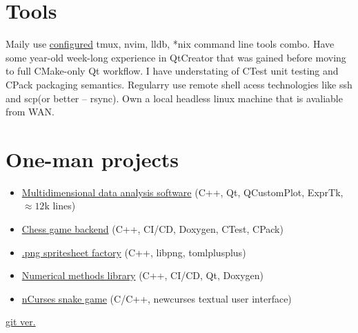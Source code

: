 \section{Tools}
Maily use \href{https://github.com//Dolfost/dotfiles}{configured} tmux, nvim,
lldb, *nix command line tools combo. Have some year-old week-long experience in
QtCreator that was gained before moving to full CMake-only Qt workflow. I have
understating of CTest unit testing and CPack packaging semantics. Regularry use
remote shell acess technologies like ssh and scp(or better -- rsync). Own a
local headless linux machine that is avaliable from WAN.

\section{One-man projects}
\begin{itemize}
	\item \href{https://github.com/Dolfost/matstat}{Multidimensional data analysis software} (C++, Qt, QCustomPlot, ExprTk, \(\approx 12\)k lines)
	\item \href{https://github.com/Dolfost/tartan}{Chess game backend} (C++, CI/CD, Doxygen, CTest, CPack)
	\item \href{https://github.com/Dolfost/ssmk/tree/develop}{.png spritesheet factory} (C++, libpng, tomlplusplus)
	\item \href{https://github.com/Dolfost/calgo}{Numerical methods library} (C++, CI/CD, Qt, Doxygen) 
	\item \href{https://github.com/Dolfost/snake-cpp}{nCurses snake game} (C/C++, newcurses textual user interface)
\end{itemize}

\vfill{}

\begin{center}
	\tiny \href{\lrthomepage}{git ver. \lrtversion}
\end{center}



